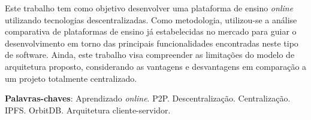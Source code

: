 \begin{resumo}
Este trabalho tem como objetivo desenvolver uma plataforma de ensino \textit{online} utilizando tecnologias descentralizadas. Como metodologia, utilizou-se a análise comparativa de plataformas de ensino já estabelecidas no mercado para guiar o desenvolvimento em torno das principais funcionalidades encontradas neste tipo de software. Ainda, este trabalho visa compreender as limitações do modelo de arquitetura proposto, considerando as vantagens e desvantagens em comparação a um projeto totalmente centralizado.

 \vspace{\onelineskip}
    
 \noindent
 \textbf{Palavras-chaves}: Aprendizado \textit{online}. P2P. Descentralização. Centralização. IPFS. OrbitDB. Arquitetura cliente-servidor. 
\end{resumo}
